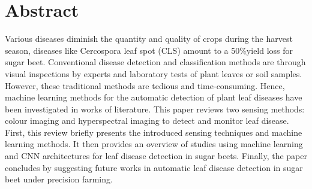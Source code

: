 

\newcommand*{\mytitle}{Disease Detection in Sugar beet Plant Leaves} %
\newcommand*{\myinstitute}{Department Lippstadt 2} %


\newcommand*{\myauthor}{Olaniyi Bayonle Alao} %
\newcommand*{\myreporttype}{Project Work} %
\newcommand*{\mygraduation}{Bachelor of Engineering} %



\newcommand*{\firstexaminer}{Prof. Dr. Stefan Henkler} %
\newcommand*{\secondexaminer}{Dipl.-Wirt.-inf. Kristian Rother} %
\newcommand*{\mydate}{\today} %





\pagestyle{empty}

\newpage 					%
\thispagestyle{empty}
\quad 
\newpage
{}
 
\cleardoubleoddpage

\newpage
 \section*{Abstract}
 Various diseases diminish the quantity and quality of crops during the harvest season, diseases like Cercospora leaf spot (CLS) amount to a 50\%yield loss for sugar beet. Conventional disease detection and classification methods are through visual inspections by experts and laboratory tests of plant leaves or soil samples. However, these traditional methods are tedious and time-consuming. Hence, machine learning methods for the automatic detection of plant leaf diseases have been investigated in works of literature. This paper reviews two sensing methods: colour imaging and hyperspectral imaging to detect and monitor leaf disease. First, this review briefly presents the introduced sensing techniques and machine learning methods. It then provides an overview of studies using machine learning and CNN architectures for leaf disease detection in sugar beets. Finally, the paper concludes by suggesting future works in automatic leaf disease detection in sugar beet under precision farming.



\tableofcontents			%


